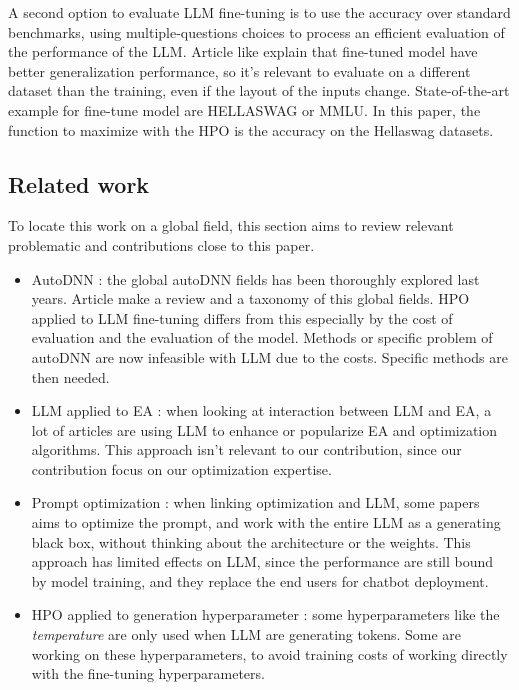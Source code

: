 \documentclass[runningheads]{llncs}
\begin{document}
A second option to evaluate LLM fine-tuning is to use the accuracy over standard benchmarks, using multiple-questions choices to process an efficient evaluation of the performance of the LLM. Article like \cite{wei_finetuned_2022} explain that fine-tuned model have better generalization performance, so it's relevant to evaluate on a different dataset than the training, even if the layout of the inputs change. State-of-the-art example for fine-tune model are HELLASWAG\cite{zellers_hellaswag_2019} or MMLU\cite{hendryckstest2021,hendrycks2021ethics}. In this paper, the function to maximize with the HPO is the accuracy on the Hellaswag datasets.



\subsection{Related work}
\label{sec:related}
To locate this work on a global field, this section aims to review relevant problematic and contributions close to this paper. 

\begin{itemize}
    \item AutoDNN : the global autoDNN fields has been thoroughly explored last years. Article \cite{talbi_automated_2021} make a review and a taxonomy of this global fields. HPO applied to LLM fine-tuning differs from this especially by the cost of evaluation and the evaluation of the model. Methods or specific problem of autoDNN are now infeasible with LLM due to the costs. Specific methods are then needed.
    \item LLM applied to EA : when looking at interaction between LLM and EA, a lot of articles \cite{liu_large_2024,cai_exploring_2024,brahmachary_large_2024} are using LLM to enhance or popularize EA and optimization algorithms. This approach isn't relevant to our contribution, since our contribution focus on our optimization expertise. 
    \item Prompt optimization : when linking optimization and LLM, some papers \cite{diao_black-box_2023,xu_gps_2022} aims to optimize the prompt, and work with the entire LLM as a generating black box, without thinking about the architecture or the weights. This approach has limited effects on LLM, since the performance are still bound by model training, and they replace the end users for chatbot deployment. 
    \item HPO applied to generation hyperparameter : some hyperparameters like the \textit{temperature} are only used when LLM are generating tokens. Some are working on these hyperparameters, to avoid training costs of working directly with the fine-tuning hyperparameters.  
\end{itemize}
\end{document}
